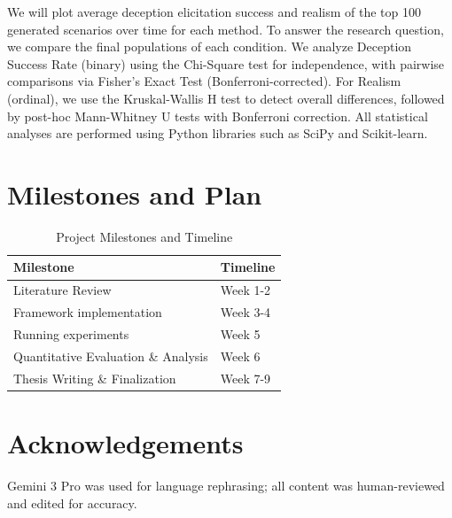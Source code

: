\documentclass[11pt, a4paper]{article}
\begin{document}
We will plot average deception elicitation success and realism of the top 100 generated scenarios over time for each method.
To answer the research question, we compare the final populations of each condition.
We analyze Deception Success Rate (binary) using the Chi-Square test for independence, with pairwise comparisons via Fisher's Exact Test (Bonferroni-corrected).
For Realism (ordinal), we use the Kruskal-Wallis H test to detect overall differences, followed by post-hoc Mann-Whitney U tests with Bonferroni correction.
All statistical analyses are performed using Python libraries such as SciPy and Scikit-learn.

\section{Milestones and Plan}

\begin{table}[H]
    \centering
    \caption{Project Milestones and Timeline}
    \begin{tabular}{@{}ll@{}}
        \toprule
        Milestone & Timeline \\
        \midrule
        Literature Review & Week 1-2 \\
        Framework implementation & Week 3-4 \\
        Running experiments & Week 5 \\
        Quantitative Evaluation \& Analysis & Week 6 \\
        Thesis Writing \& Finalization & Week 7-9 \\
        \bottomrule
    \end{tabular}
\end{table}

\section*{Acknowledgements}
Gemini 3 Pro \parencite{Gemini3ProModelCard} was used for language rephrasing; all content was human-reviewed and edited for accuracy.

\newpage
\printbibliography
\end{document}
